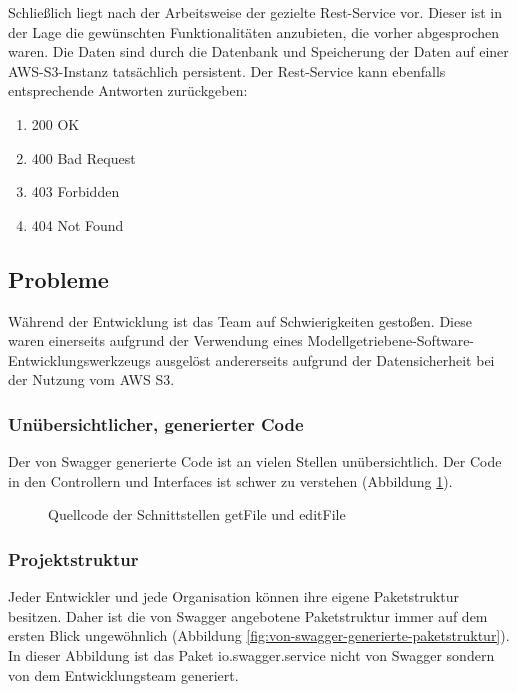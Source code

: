 \documentclass[a4paper,twoside]{article}
\begin{document}
	Schlie\ss{}lich liegt nach der Arbeitsweise der gezielte Rest-Service vor. Dieser ist in der Lage die gew\"unschten Funktionalit\"aten anzubieten, die vorher abgesprochen waren. Die Daten sind durch die Datenbank und Speicherung der Daten auf einer AWS-S3-Instanz tats\"achlich persistent. Der Rest-Service kann ebenfalls entsprechende Antworten zur\"uckgeben:
	\begin{enumerate}
		\item 200 OK
		\item 400 Bad Request
		\item 403 Forbidden
		\item 404 Not Found
	\end{enumerate}
	
	\subsection{Probleme}
	
	W\"ahrend der Entwicklung ist das Team auf Schwierigkeiten gesto\ss{}en. Diese waren einerseits aufgrund der Verwendung eines Modellgetriebene-Software-Entwicklungswerkzeugs ausgel\"ost andererseits aufgrund der Datensicherheit bei der Nutzung vom AWS S3.
	
	\subsubsection{Un\"ubersichtlicher, generierter Code}
	
	Der von Swagger generierte Code ist an vielen Stellen un\"ubersichtlich. Der Code in den Controllern und Interfaces ist schwer zu verstehen  (Abbildung \ref{fig:quellcode-der-schnittstellen-getFile-und-editFile}). 
	
	\begin{figure}[ht]
		\centering
		{}
		\caption{Quellcode der Schnittstellen getFile und editFile}
		\label{fig:quellcode-der-schnittstellen-getFile-und-editFile}
	\end{figure}
	
	\subsubsection{Projektstruktur}
	
	Jeder Entwickler und jede Organisation k\"onnen ihre eigene Paketstruktur besitzen. Daher ist die von Swagger angebotene Paketstruktur immer auf dem ersten Blick ungew\"ohnlich (Abbildung \ref{fig:von-swagger-generierte-paketstruktur}). In dieser Abbildung ist das Paket io.swagger.service nicht von Swagger sondern von dem Entwicklungsteam generiert.
	
\end{document}
